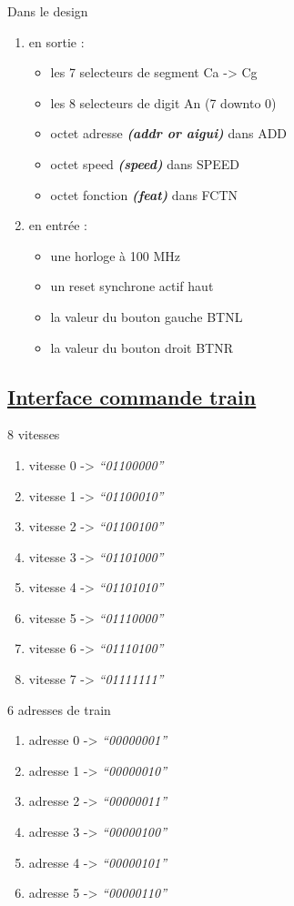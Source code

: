 \hrulefill

Dans le design
\begin{enumerate}
\item en sortie :
  \begin{itemize}  
  \item les 7 selecteurs de segment Ca -> Cg
  \item les 8 selecteurs de digit   An (7 downto 0)
  \item octet adresse \textbf{\emph{(addr or aigui)}}  dans ADD
  \item octet speed \textbf{\emph{(speed)}}  dans SPEED
  \item octet fonction \textbf{\emph{(feat)}}  dans FCTN    
  \end{itemize}  
\item en entrée :
  \begin{itemize}  
  \item une horloge à 100 MHz
  \item un reset synchrone actif haut 
  \item la valeur du bouton gauche BTNL
  \item la valeur du bouton droit BTNR    
  \end{itemize}  
\end{enumerate}

\subsection{\underline{Interface commande train}}
\label{sec:ihm-train}

\bigskip

8 vitesses
\begin {enumerate}
\item vitesse 0 -> \emph{``01100000''}
\item vitesse 1 -> \emph{``01100010''}
\item vitesse 2 -> \emph{``01100100''}
\item vitesse 3 -> \emph{``01101000''}
\item vitesse 4 -> \emph{``01101010''}
\item vitesse 5 -> \emph{``01110000''}
\item vitesse 6 -> \emph{``01110100''}
\item vitesse 7 -> \emph{``01111111''}
\end {enumerate}  

\bigskip

6 adresses de train
\begin {enumerate}
\item adresse 0 -> \emph{``00000001''}
\item adresse 1 -> \emph{``00000010''}
\item adresse 2 -> \emph{``00000011''}
\item adresse 3 -> \emph{``00000100''}
\item adresse 4 -> \emph{``00000101''}
\item adresse 5 -> \emph{``00000110''}
\end {enumerate}  

